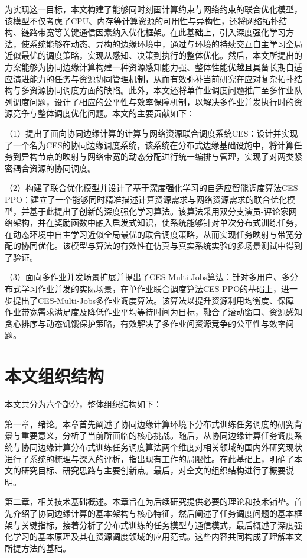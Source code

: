 为实现这一目标，本文构建了能够同时刻画计算约束与网络约束的联合优化模型，该模型不仅考虑了CPU、内存等计算资源的可用性与异构性，还将网络拓扑结构、链路带宽等关键通信因素纳入优化框架。在此基础上，引入深度强化学习方法，使系统能够在动态、异构的边缘环境中，通过与环境的持续交互自主学习全局近似最优的调度策略，实现从感知、决策到执行的整体优化。然后，本文所提出的方案能够为协同边缘计算构建一种资源感知能力强、整体性能优越且具备长期自适应演进能力的任务与资源协同管理机制，从而有效弥补当前研究在应对复杂拓扑结构与多资源协同调度方面的缺陷。此外，本文还将单作业调度问题推广至多作业队列调度问题，设计了相应的公平性与效率保障机制，以解决多作业并发执行时的资源竞争与整体调度优化问题。本文的主要贡献如下：

（1）提出了面向协同边缘计算的计算与网络资源联合调度系统CES：设计并实现了一个名为CES的协同边缘调度系统，该系统在分布式边缘基础设施中，将计算任务到异构节点的映射与网络带宽的动态分配进行统一编排与管理，实现了对两类紧密耦合资源的协同调度。

（2）构建了联合优化模型并设计了基于深度强化学习的自适应智能调度算法CES-PPO：建立了一个能够同时精准描述计算资源需求与网络资源需求的联合优化模型，并基于此提出了创新的深度强化学习算法。该算法采用双分支演员-评论家网络架构，并在奖励函数中融入启发式知识，使系统能够针对单次分布式训练任务，在动态环境中自主学习近似全局最优的联合调度策略，从而实现任务映射与带宽分配的协同优化。该模型与算法的有效性在仿真与真实系统实验的多场景测试中得到了验证。

（3）面向多作业并发场景扩展并提出了CES-Multi-Jobs算法：针对多用户、多分布式学习作业并发的实际场景，在单作业联合调度算法CES-PPO的基础上，进一步提出了CES-Multi-Jobs多作业调度算法。该算法以提升资源利用均衡度、保障作业带宽需求满足度及降低作业平均等待时间为目标，融合了滚动窗口、资源感知贪心排序与动态饥饿保护策略，有效解决了多作业间资源竞争的公平性与效率问题。
\section{本文组织结构}
本文共分为六个部分，整体组织结构如下：

第一章，绪论。本章首先阐述了协同边缘计算环境下分布式训练任务调度的研究背景与重要意义，分析了当前所面临的核心挑战。随后，从协同边缘计算任务调度系统与协同边缘计算分布式训练任务调度算法两个维度对相关领域的国内外研究现状进行了系统的梳理与深入的评析，指出现有工作的局限性。在此基础上，明确了本文的研究目标、研究思路与主要创新点。最后，对全文的组织结构进行了概要说明。

第二章，相关技术基础概述。本章旨在为后续研究提供必要的理论和技术铺垫。首先介绍了协同边缘计算的基本架构与核心特征，然后阐述了任务调度问题的基本框架与关键指标，接着分析了分布式训练的任务模型与通信模式，最后概述了深度强化学习的基本原理及其在资源调度领域的应用范式。这些内容共同构成了理解本文所提方法的基础。

